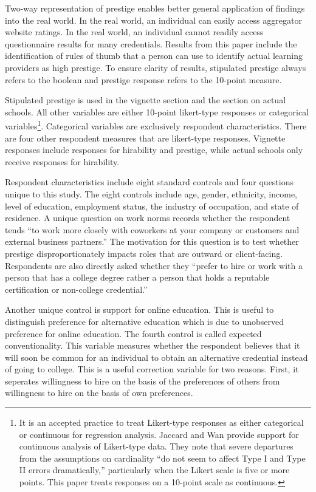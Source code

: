 \documentclass[review]{elsarticle}
\begin{document}
Two-way representation of prestige enables better general application of findings into the real world.
In the real world, an individual can easily access aggregator website ratings.
In the real world, an individual cannot readily access questionnaire results for many credentials.
Results from this paper include the identification of rules of thumb
that a person can use to identify actual learning providers as high prestige.
To ensure clarity of results,
stipulated prestige always refers to the boolean and prestige response refers to the 10-point measure.

Stipulated prestige is used in the vignette section and the section on actual schools.
All other variables are either 10-point likert-type responses or categorical variables\footnote{
    It is an accepted practice to treat Likert-type responses as either categorical or continuous for regression analysis.
    Jaccard and Wan provide support for continuous analysis of Likert-type data.
    They note that severe departures from the assumptions on cardinality ``do not seem to affect Type I and Type II errors dramatically,''
    particularly when the Likert scale is five or more points\cite{jaccard1996lisrel}.
    This paper treats responses on a 10-point scale as continuous.
}.
Categorical variables are exclusively respondent characteristics.
There are four other respondent measures that are likert-type responses.
Vignette responses include responses for hirability and prestige,
while actual schools only receive responses for hirability.

Respondent characteristics include eight standard controls and four questions unique to this study.
The eight controls include
age, gender, ethnicity, income,
level of education, employment status, the industry of occupation, and state of residence.
A unique question on work norms records whether the respondent tends ``to work more closely with coworkers at your company or customers and external business partners.''
The motivation for this question is to test whether prestige disproportionately impacts roles that are outward or client-facing.
Respondents are also directly asked whether they
``prefer to hire or work with a person that has a college degree rather a person that holds a reputable certification or non-college credential.''

Another unique control is support for online education.
This is useful to distinguish preference for alternative education which is due to unobserved preference for online education.
The fourth control is called expected conventionality.
This variable measures whether the respondent believes
that it will soon be common for an individual to obtain an alternative credential instead of going to college.
This is a useful correction variable for two reasons.
First, it seperates willingness to hire on the basis of the preferences of others from
willingness to hire on the basis of own preferences.
\end{document}
